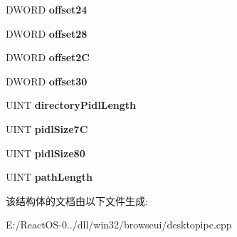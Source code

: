 \begin{DoxyCompactItemize}
D\+W\+O\+RD {\bfseries offset24}
\item 
\mbox{\label{struct_h_n_f_block_ae80a50b6fc0fd3e438b37b58158a1a98}} 
D\+W\+O\+RD {\bfseries offset28}
\item 
\mbox{\label{struct_h_n_f_block_af56303798d200df58fa9b868d1a3234d}} 
D\+W\+O\+RD {\bfseries offset2C}
\item 
\mbox{\label{struct_h_n_f_block_a3540f0af1b79bbb3cfe6bdd25d8c488c}} 
D\+W\+O\+RD {\bfseries offset30}
\item 
\mbox{\label{struct_h_n_f_block_a7f6ded79c74251ceee73b1a317054dbf}} 
U\+I\+NT {\bfseries directory\+Pidl\+Length}
\item 
\mbox{\label{struct_h_n_f_block_a5e485ae6ea8460e5631659da035f6f3e}} 
U\+I\+NT {\bfseries pidl\+Size7C}
\item 
\mbox{\label{struct_h_n_f_block_aa5956a185590171f0c3494e80162329b}} 
U\+I\+NT {\bfseries pidl\+Size80}
\item 
\mbox{\label{struct_h_n_f_block_abd9889613629b9718915d24772c481d0}} 
U\+I\+NT {\bfseries path\+Length}
\end{DoxyCompactItemize}


该结构体的文档由以下文件生成\+:\begin{DoxyCompactItemize}
\item 
E\+:/\+React\+O\+S-\/0../dll/win32/browseui/desktopipc.\+cpp\end{DoxyCompactItemize}
